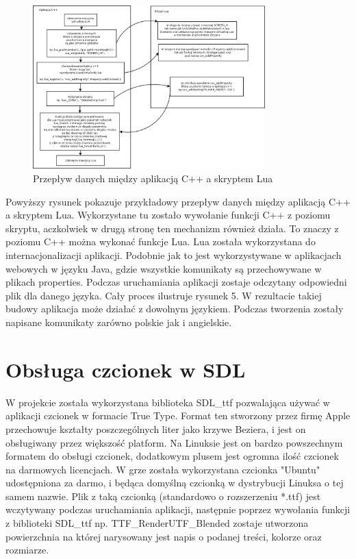 \begin{figure}[h]
    \centering
    \includegraphics[width=0.8\textwidth,natwidth=410,natheight=142]{./Pictures/lua_skrypty.png}
    \caption{Przepływ danych między aplikacją C++ a skryptem Lua}
\end{figure}

Powyższy rysunek pokazuje przykładowy przepływ danych między aplikacją C++ a skryptem Lua. Wykorzystane tu zostało wywołanie funkcji C++ z poziomu skryptu, aczkolwiek w drugą stronę ten mechanizm również działa. To znaczy z poziomu C++ można wykonać funkcje Lua. Lua została wykorzystana do internacjonalizacji aplikacji. Podobnie jak to jest wykorzystywane w aplikacjach webowych w języku Java, gdzie wszystkie komunikaty są przechowywane w plikach properties. Podczas uruchamiania aplikacji zostaje odczytany odpowiedni plik dla danego języka. Cały proces ilustruje rysunek 5. W rezultacie takiej budowy aplikacja może działać z dowolnym językiem. Podczas tworzenia zostały napisane komunikaty zarówno polskie jak i angielskie.


\section{Obsługa czcionek w SDL}
W projekcie została wykorzystana biblioteka SDL\_ttf pozwalająca używać w aplikacji czcionek w formacie True Type. Format ten stworzony przez firmę Apple przechowuje kształty poszczególnych liter jako krzywe Beziera, i jest on obsługiwany przez większość platform. Na Linuksie jest on bardzo powszechnym formatem do obsługi czcionek, dodatkowym plusem jest ogromna ilość czcionek na darmowych licencjach. W grze została wykorzystana czcionka "Ubuntu" udostępniona za darmo, i będąca domyślną czcionką w dystrybucji Linuksa o tej samem nazwie. Plik z taką czcionką (standardowo o rozszerzeniu *.ttf) jest wczytywany podczas uruchamiania aplikacji, następnie poprzez wywołania funkcji z biblioteki SDL\_ttf np. TTF\_RenderUTF\_Blended zostaje utworzona powierzchnia na której narysowany jest napis o podanej treści, kolorze oraz rozmiarze. 

